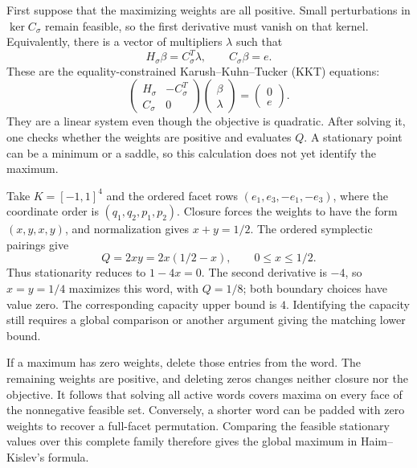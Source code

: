 First suppose that the maximizing weights are all positive. Small
perturbations in $\ker C_\sigma$ remain feasible, so the first derivative
must vanish on that kernel. Equivalently, there is a vector of multipliers
$\lambda$ such that
\[
 H_\sigma\beta=C_\sigma^T\lambda,\qquad C_\sigma\beta=e.
\]
These are the equality-constrained Karush--Kuhn--Tucker (KKT) equations:
\begin{equation}\label{eq:qp-stationary-system}
 \begin{pmatrix}H_\sigma&-C_\sigma^T\\C_\sigma&0\end{pmatrix}
 \begin{pmatrix}\beta\\\lambda\end{pmatrix}
 =\begin{pmatrix}0\\e\end{pmatrix}.
\end{equation}
They are a linear system even though the objective is quadratic. After
solving it, one checks whether the weights are positive and evaluates $Q$.
A stationary point can be a minimum or a saddle, so this calculation does
not yet identify the maximum.

\begin{example}
Take $K=[-1,1]^4$ and the ordered facet rows
$(e_1,e_3,-e_1,-e_3)$, where the coordinate order is
$(q_1,q_2,p_1,p_2)$. Closure forces the weights to have the form
$(x,y,x,y)$, and normalization gives $x+y=1/2$. The ordered symplectic
pairings give
\[
 Q=2xy=2x(1/2-x),\qquad 0\leq x\leq1/2.
\]
Thus stationarity reduces to $1-4x=0$. The second derivative is $-4$,
so $x=y=1/4$ maximizes this word, with $Q=1/8$; both boundary choices
have value zero. The corresponding capacity upper bound is $4$.
Identifying the capacity still requires a global
comparison or another argument giving the matching lower bound.
\end{example}

If a maximum has zero weights, delete those entries from the word. The
remaining weights are positive, and deleting zeros changes neither closure
nor the objective. It follows that solving all active words covers maxima
on every face of the nonnegative feasible set. Conversely, a shorter word
can be padded with zero weights to recover a full-facet permutation.
Comparing the feasible stationary values over this complete family
therefore gives the global maximum in Haim--Kislev's formula.

